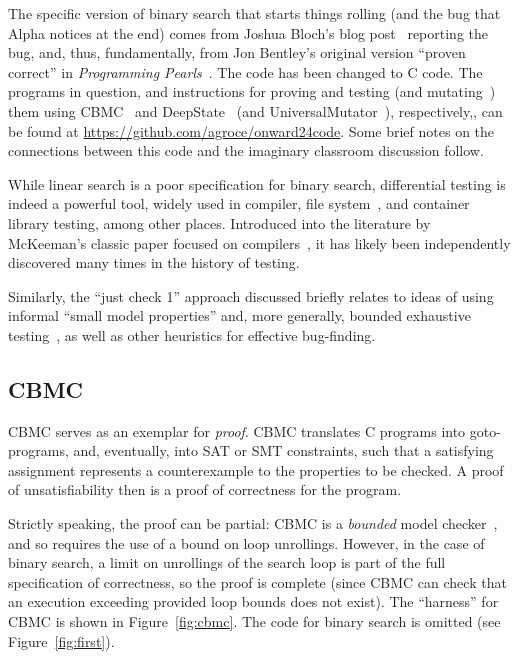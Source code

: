 \documentclass[sigplan]{acmart}
\begin{document}
The specific version of binary search that starts things rolling (and the bug
that Alpha notices at the end) comes from Joshua Bloch's blog post~\cite{bloch} reporting
the bug, and, thus, fundamentally, from Jon Bentley's original version ``proven
correct'' in \emph{Programming Pearls}~\cite{Pearls}.  The code has
been changed to C code.  The programs in question, and instructions
for proving and testing (and mutating~\cite{MutationSurvey}) them using CBMC~\cite{CBMCp} and
DeepState~\cite{goodman2018deepstate} (and UniversalMutator~\cite{SyntaxUM}), respectively,, can be found at
\url{https://github.com/agroce/onward24code}.  Some brief notes on the
connections between this code and the imaginary classroom discussion follow.

While linear search is a poor specification for binary search,
differential testing is indeed a powerful tool, widely used in compiler, file
system~\cite{ICSEDiff}, and container library testing, among other places.  Introduced
into the literature by McKeeman's classic paper focused on
compilers~\cite{Differential}, it has likely been independently
discovered many times in the history of testing.

Similarly, the ``just check 1'' approach discussed briefly relates to
ideas of using informal ``small model properties'' and, more
generally, bounded exhaustive testing~\cite{sullivan2004software},
as well as other heuristics for effective bug-finding.

\subsection{CBMC}


CBMC serves as an exemplar for \emph{proof}.  CBMC
translates C programs into goto-programs, and, eventually, into SAT or
SMT constraints, such that a satisfying assignment represents a
counterexample to the properties to be checked.  A proof of
unsatisfiability then is a proof of correctness for the program.

Strictly speaking, the
proof can be partial: CBMC is a \emph{bounded} model checker~\cite{BMC}, and so
requires the use of a bound on loop unrollings.  However, in the case
of binary search, a limit on unrollings of the search loop is part of
the full specification of correctness, so the proof is complete (since
CBMC can check that an execution exceeding provided loop bounds does
not exist).  The ``harness'' for CBMC is shown in
Figure~\ref{fig:cbmc}.  The code for binary search is omitted (see
Figure~\ref{fig:first}).
\end{document}

